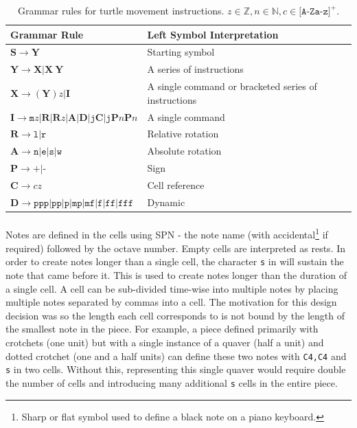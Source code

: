 \begin{table}
\centering
\caption{Grammar rules for turtle movement instructions. $z \in \mathbb{Z}, n \in \mathbb{N}, c \in \texttt{[A-Za-z]}^{+}$.}
\vspace{1pt}
\begin{tabular}{|l|l|} \hline
\textbf{Grammar Rule}&\textbf{Left Symbol Interpretation}\\ \hline
\( \mathbf{S} \rightarrow \mathbf{Y} \)& Starting symbol\\ \hline
\( \mathbf{Y} \rightarrow \mathbf{X} | \mathbf{X} \ \mathbf{Y} \)& A series of instructions\\ \hline
\( \mathbf{X} \rightarrow (\mathbf{Y})z|\mathbf{I} \)& A single command or bracketed series of instructions\\ \hline
\( \mathbf{I} \rightarrow \texttt{m}z|\mathbf{R}|\mathbf{R}z|\mathbf{A}|\mathbf{D}|\texttt{j}\mathbf{C}|\texttt{j}\mathbf{P}n\mathbf{P}n \)& A single command\\ \hline
\( \mathbf{R} \rightarrow \texttt{l}|\texttt{r} \)& Relative rotation\\ \hline
\( \mathbf{A} \rightarrow \texttt{n}|\texttt{e}|\texttt{s}|\texttt{w} \)& Absolute rotation\\ \hline
\( \mathbf{P} \rightarrow \texttt{+}|\texttt{-} \)& Sign\\ \hline
\( \mathbf{C} \rightarrow cz \)& Cell reference\\ \hline
\( \mathbf{D} \rightarrow \texttt{ppp}|\texttt{pp}|\texttt{p}|\texttt{mp}|\texttt{mf}|\texttt{f}|\texttt{ff}|\texttt{fff} \)& Dynamic\\
\hline\end{tabular}
\label{tab:grammar}
\end{table}

\paragraph{} Notes are defined in the cells using SPN - the note name (with accidental\footnote{Sharp or flat symbol used to define a black note on a piano keyboard.} if required) followed by the octave number. Empty cells are interpreted as rests. In order to create notes longer than a single cell, the character \texttt{s} in will sustain the note that came before it. This is used to create notes longer than the duration of a single cell. A cell can be sub-divided time-wise into multiple notes by placing multiple notes separated by commas into a cell. The motivation for this design decision was so the length each cell corresponds to is not bound by the length of the smallest note in the piece. For example, a piece defined primarily with crotchets (one unit) but with a single instance of a quaver (half a unit) and dotted crotchet (one and a half units) can define these two notes with \texttt{C4,C4} and \texttt{s} in two cells. Without this, representing this single quaver would require double the number of cells and introducing many additional \texttt{s} cells in the entire piece.

